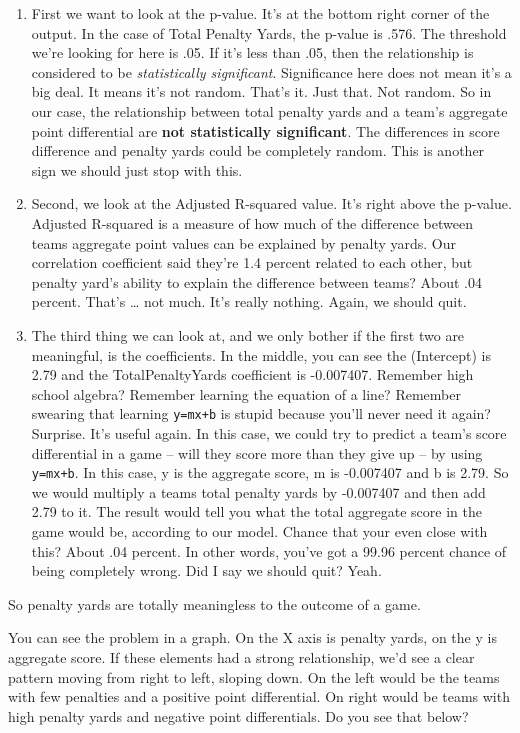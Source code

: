 \documentclass[
]{book}
\providecommand{\tightlist}{%
  \setlength{\itemsep}{0pt}\setlength{\parskip}{0pt}}
\begin{document}
\begin{enumerate}
\def\labelenumi{\arabic{enumi}.}
\tightlist
\item
  First we want to look at the p-value. It's at the bottom right corner of the output. In the case of Total Penalty Yards, the p-value is .576. The threshold we're looking for here is .05. If it's less than .05, then the relationship is considered to be \emph{statistically significant}. Significance here does not mean it's a big deal. It means it's not random. That's it. Just that. Not random. So in our case, the relationship between total penalty yards and a team's aggregate point differential are \textbf{not statistically significant}. The differences in score difference and penalty yards could be completely random. This is another sign we should just stop with this.
\item
  Second, we look at the Adjusted R-squared value. It's right above the p-value. Adjusted R-squared is a measure of how much of the difference between teams aggregate point values can be explained by penalty yards. Our correlation coefficient said they're 1.4 percent related to each other, but penalty yard's ability to explain the difference between teams? About .04 percent. That's \ldots{} not much. It's really nothing. Again, we should quit.
\item
  The third thing we can look at, and we only bother if the first two are meaningful, is the coefficients. In the middle, you can see the (Intercept) is 2.79 and the TotalPenaltyYards coefficient is -0.007407. Remember high school algebra? Remember learning the equation of a line? Remember swearing that learning \texttt{y=mx+b} is stupid because you'll never need it again? Surprise. It's useful again. In this case, we could try to predict a team's score differential in a game -- will they score more than they give up -- by using \texttt{y=mx+b}. In this case, y is the aggregate score, m is -0.007407 and b is 2.79. So we would multiply a teams total penalty yards by -0.007407 and then add 2.79 to it. The result would tell you what the total aggregate score in the game would be, according to our model. Chance that your even close with this? About .04 percent. In other words, you've got a 99.96 percent chance of being completely wrong. Did I say we should quit? Yeah.
\end{enumerate}

So penalty yards are totally meaningless to the outcome of a game.

You can see the problem in a graph. On the X axis is penalty yards, on the y is aggregate score. If these elements had a strong relationship, we'd see a clear pattern moving from right to left, sloping down. On the left would be the teams with few penalties and a positive point differential. On right would be teams with high penalty yards and negative point differentials. Do you see that below?
\end{document}
